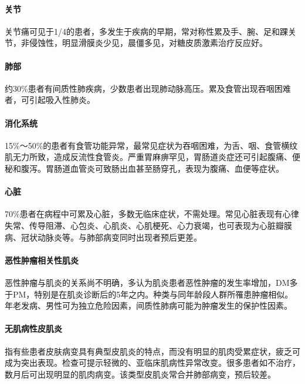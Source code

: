 \paragraph{关节}

关节痛可见于1/4的患者，多发生于疾病的早期，常对称性累及手、腕、足和踝关节，非侵蚀性，明显滑膜炎少见，晨僵多见，对糖皮质激素治疗反应好。

\paragraph{肺部}

约30\%患者有间质性肺疾病，少数患者出现肺动脉高压。累及食管出现吞咽困难者，可引起吸入性肺炎。

\paragraph{消化系统}

15\%～50\%的患者有食管功能异常，最常见症状为吞咽困难，为舌、咽、食管横纹肌无力所致，造成反流性食管炎。严重胃麻痹罕见，胃肠道炎症还可引起腹痛、便秘和腹泻。胃肠道血管炎可致肠出血甚至肠穿孔，表现为腹痛、血便等症状。

\paragraph{心脏}

70\%患者在病程中可累及心脏，多数无临床症状，不需处理。常见心脏表现有心律失常、传导阻滞、心包炎、心肌炎、心肌梗死、心力衰竭，也可表现为心脏瓣膜病、冠状动脉炎等。与肺部病变同时出现者预后更差。

\paragraph{恶性肿瘤相关性肌炎}

恶性肿瘤与肌炎的关系尚不明确，多认为肌炎患者恶性肿瘤的发生率增加，DM多于PM，特别是在肌炎诊断后的5年之内。种类与同年龄段人群所罹患肿瘤相似。年老发病、男性可为独立危险因素，间质性肺病可能为肿瘤发生的保护性因素。

\paragraph{无肌病性皮肌炎}

指有些患者皮肤病变具有典型皮肌炎的特点，而没有明显的肌肉受累症状，疲乏可成为突出表现。检查可提示轻微的、亚临床肌病性异常改变。很多患者如不治疗，数月后可出现明显的肌肉病变。该类型皮肌炎常合并肺部病变，预后较差。

